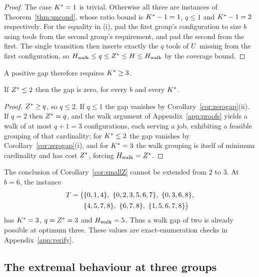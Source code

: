 \begin{proof}
The case $K^{\ast}=1$ is trivial. Otherwise all three are instances of
Theorem~\ref{thm:uncond}, whose ratio bound is
$K^{\ast}-1=1$, $q\le1$ and $K^{\ast}-1=2$ respectively. For the equality in (i), pad the
first group's configuration to size $b$ using tools from the second group's
requirement, and pad the second from the first. The single transition then inserts
exactly the $q$ tools of $U$ missing from the first configuration, so
$H_{\mathrm{walk}}\le q\le Z^{\ast}\le H\le H_{\mathrm{walk}}$ by the coverage bound.
\end{proof}

A positive gap therefore requires $K^{\ast}\ge3$.

\begin{corollary}\label{cor:smallZ}
If $Z^{\ast}\le2$ then the gap is zero, for every $b$ and every $K^{\ast}$.
\end{corollary}

\begin{proof}
$Z^{\ast}\ge q$, so $q\le2$. If $q\le1$ the gap vanishes by
Corollary~\ref{cor:zerogap}(ii). If $q=2$ then $Z^{\ast}=q$, and the walk argument of
Appendix~\ref{app:proofs} yields a walk of at most $q+1=3$ configurations, each
serving a job, exhibiting a feasible grouping of that cardinality; for $K^{\ast}\le2$ the
gap vanishes by Corollary~\ref{cor:zerogap}(i), and for $K^{\ast}=3$ the walk grouping is
itself of minimum cardinality and has cost $Z^{\ast}$, forcing $H_{\mathrm{walk}}=Z^{\ast}$.
\end{proof}

\begin{observation}\label{obs:z3}
The conclusion of Corollary~\ref{cor:smallZ} cannot be extended from $2$ to $3$.
At $b=6$, the instance
\[
\begin{aligned}
T=\bigl(&\{0,1,4\},\ \{0,2,3,5,6,7\},\
\{0,3,6,8\},\\
&\{4,5,7,8\},\ \{6,7,8\},\
\{1,5,6,7,8\}\bigr)
\end{aligned}
\]
has $K^{\ast}=3$, $q=Z^{\ast}=3$ and $H_{\mathrm{walk}}=5$. Thus a walk gap of two is already possible
at optimum three. These values are exact-enumeration checks in
Appendix~\ref{app:verify}.
\end{observation}

\subsection{The extremal behaviour at three groups}\label{ssec:law}

